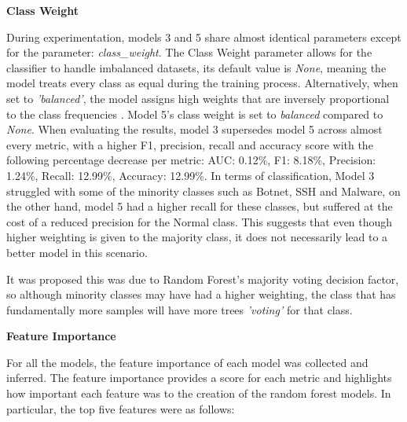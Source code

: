 \medskip
\textbf{Class Weight}

During experimentation, models 3 and 5 share almost identical parameters except for the parameter: \textit{class\_weight}. The Class Weight parameter allows for the classifier to handle imbalanced datasets, its default value is \textit{None}, meaning the model treats every class as equal during the training process. Alternatively, when set to \textit{'balanced'}, the model assigns high weights that are inversely proportional to the class frequencies \parencite{scikit-learn}. Model 5's class weight is set to \textit{balanced} compared to \textit{None}. When evaluating the results, model 3 supersedes model 5 across almost every metric, with a higher F1, precision, recall and accuracy score with the following percentage decrease per metric: AUC: 0.12\%, F1: 8.18\%, Precision: 1.24\%, Recall: 12.99\%, Accuracy: 12.99\%. In terms of classification, Model 3 struggled with some of the minority classes such as Botnet, SSH and Malware, on the other hand, model 5 had a higher recall for these classes, but suffered at the cost of a reduced precision for the Normal class. This suggests that even though higher weighting is given to the majority class, it does not necessarily lead to a better model in this scenario.

It was proposed this was due to Random Forest's majority voting decision factor, so although minority classes may have had a higher weighting, the class that has fundamentally more samples will have more trees \textit{'voting'} for that class.



\medskip
\textbf{Feature Importance}

For all the models, the feature importance of each model was collected and inferred. The feature importance provides a score for each metric and highlights how important each feature was to the creation of the random forest models. In particular, the top five features were as follows:

